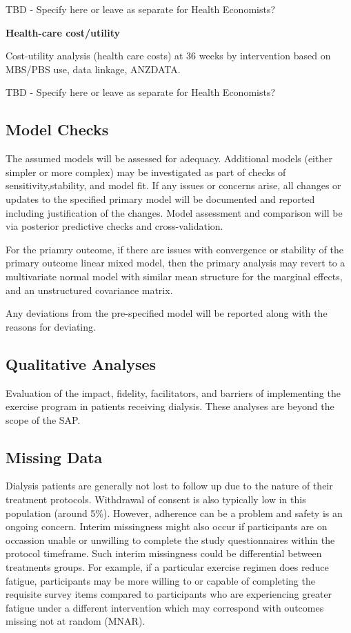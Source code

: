 \documentclass[11pt,parskip=half-]{scrartcl}
\begin{document}
TBD - Specify here or leave as separate for Health Economists?

\textbf{Health-care cost/utility}

Cost-utility analysis (health care costs) at 36 weeks by intervention based on MBS/PBS use, data linkage, ANZDATA.

TBD - Specify here or leave as separate for Health Economists?


\subsection{Model Checks}\label{model-checks}

The assumed models will be assessed for adequacy. Additional models (either simpler or more complex) may be investigated as part of checks of sensitivity,stability, and model fit. If any issues or concerns arise, all changes or updates to the specified primary model will be documented and reported including justification of the changes. Model assessment and comparison will be via posterior predictive checks and cross-validation.

For the priamry outcome, if there are issues with convergence or stability of the primary outcome linear mixed model, then the primary analysis may revert to a multivariate normal model with similar mean structure for the marginal effects, and an unstructured covariance matrix.

Any deviations from the pre-specified model will be reported along with the reasons for deviating.

\subsection{Qualitative Analyses}\label{qualitative-analyses}

Evaluation of the impact, fidelity, facilitators, and barriers of implementing the exercise program in patients receiving dialysis. These analyses are beyond the scope of the SAP.

\subsection{Missing Data}\label{missing-data}

Dialysis patients are generally not lost to follow up due to the nature of their treatment protocols. Withdrawal of consent is also typically low in this population (around 5\%). However, adherence can be a problem and safety is an ongoing concern. Interim missingness might also occur if participants are on occassion unable or unwilling to complete the study questionnaires within the protocol timeframe. Such interim missingness could be differential between treatments groups. For example, if a particular exercise regimen does reduce fatigue, participants may be more willing to or capable of completing the requisite survey items compared to participants who are experiencing greater fatigue under a different intervention which may correspond with outcomes missing not at random (MNAR).
\end{document}
